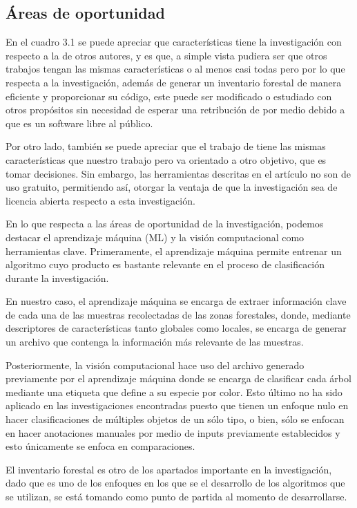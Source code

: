 \subsection{Áreas de oportunidad}
En el cuadro 3.1 se puede apreciar que características tiene la investigación con respecto a la de otros autores, y es que, a simple vista pudiera ser que otros trabajos tengan las mismas características o al menos casi todas pero por lo que respecta a la investigación, además de generar un inventario forestal de manera eficiente y proporcionar su código, este puede ser modificado o estudiado con otros propósitos sin necesidad de esperar una retribución de por medio debido a que es un software libre al público.

\newpage
Por otro lado, también se puede apreciar que el trabajo de \citet{rf10} tiene las mismas características que nuestro trabajo pero va orientado a otro objetivo, que es tomar decisiones. Sin embargo, las herramientas descritas en el artículo no son de uso gratuito, permitiendo así, otorgar la ventaja de que la investigación sea de licencia abierta respecto a esta investigación.

En lo que respecta a las áreas de oportunidad de la investigación, podemos destacar el aprendizaje máquina (ML) y la visión computacional como herramientas clave. Primeramente, el aprendizaje máquina permite entrenar un algoritmo cuyo producto es bastante relevante en el proceso de clasificación durante la investigación.

En nuestro caso, el aprendizaje máquina se encarga de extraer información clave de cada una de las muestras recolectadas de las zonas forestales, donde, mediante descriptores de características tanto globales como locales, se encarga de generar un archivo que contenga la información más relevante de las muestras.

Posteriormente, la visión computacional hace uso del archivo generado previamente por el aprendizaje máquina donde se encarga de clasificar cada árbol mediante una etiqueta que define a su especie por color. Esto último no ha sido aplicado en las investigaciones encontradas puesto que tienen un enfoque nulo en hacer clasificaciones de múltiples objetos de un sólo tipo, o bien, sólo se enfocan en hacer anotaciones manuales por medio de inputs previamente establecidos y esto únicamente se enfoca en comparaciones.

El inventario forestal es otro de los apartados importante en la investigación, dado que es uno de los enfoques en los que se el desarrollo de los algoritmos que se utilizan, se está tomando como punto de partida al momento de desarrollarse. 

